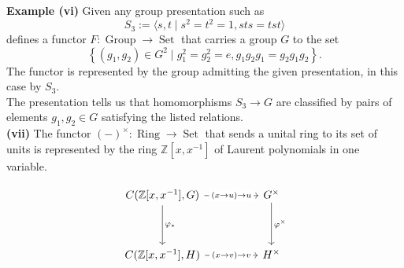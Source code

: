 \documentclass[a4paper]{article}
\DeclareMathOperator{\Set}{Set}
\DeclareMathOperator{\Group}{Group}
\DeclareMathOperator{\Ring}{Ring}
\begin{document}
\textbf{Example (vi)} Given any group presentation such as
\[
S_3 := \langle s,t  \mid s^2 = t^2 =1, sts =tst \rangle
\] 
defines a functor $F  \colon \Group \to \Set$ that carries a group $G$ to the set
\[
\left\{ \left( g_1, g_2 \right) \in G^2  \mid 
g_1^2 = g_2^2 = e, g_1g_2g_1 = g_2g_1g_2 \right\} .
\] 
The functor is represented by the group admitting the given presentation, in
this case by $S_3$.\\
The presentation tells us that homomorphisms $S_3 \to G$ are
classified by pairs of elements $g_1, g_2 \in G$ satisfying the listed
relations.\\
\linebreak
\textbf{(vii)} The functor $(-)^{\times }  \colon \Ring \to \Set$ that sends
a unital ring to its set of units is represented by the ring
$\mathbb{Z} \left[ x, x^{-1} \right] $ of Laurent polynomials in one variable.

\[\begin{tikzcd}
	{C(\mathbb{Z}[x,x^{-1}],G)} && {G^{\times}} \\
	\\
	{C(\mathbb{Z}[x,x^{-1}],H)} && {H^{\times}}
	\arrow["{\varphi_*}", from=1-1, to=3-1]
	\arrow["{\varphi^{\times}}", from=1-3, to=3-3]
	\arrow["{(x \to u) \to u}"{description}, from=1-1, to=1-3]
	\arrow["{(x \to v) \to v}"{description}, from=3-1, to=3-3]
\end{tikzcd}\]
\end{document}
